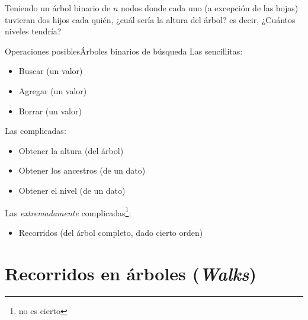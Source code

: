 \documentclass[usenames, dvipsnames, spanish, c]{beamer}
\begin{document}
\begin{frame}[plain]
    \begin{center}
        \huge
        Teniendo un árbol binario de $n$ nodos donde cada uno (a excepción de las hojas) tuvieran dos hijos cada quién, ¿cuál sería la altura del árbol? es decir, ¿Cuántos niveles tendría?
    \end{center}
\end{frame}

\begin{frame}{Operaciones posibles}{Árboles binarios de búsqueda}
    Las sencillitas:
    \begin{itemize}
        \item Buscar (un valor)
        \item Agregar (un valor)
        \item Borrar (un valor)
    \end{itemize} \pause

    \bigskip

    Las complicadas:
    \begin{itemize}
        \item Obtener la altura (del árbol)
        \item Obtener los ancestros (de un dato)
        \item Obtener el nivel (de un dato)
    \end{itemize} \pause

    \bigskip

    Las \textit{extremadamente} complicadas\footnote{\scriptsize no es cierto}:
    \begin{itemize}
        \item Recorridos (del árbol completo, dado cierto orden)
    \end{itemize}
\end{frame}

\section{Recorridos en árboles (\textit{Walks})}





\end{document}
